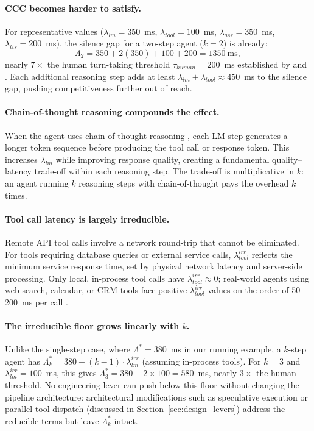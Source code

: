 \paragraph{CCC becomes harder to satisfy.}
For representative values ($\lambda_{lm} = 350$~ms, $\lambda_{tool} = 100$~ms,
$\lambda_{asr} = 350$~ms, $\lambda_{tts} = 200$~ms),
the silence gap for a two-step agent ($k = 2$) is already:
\[
  \Lambda_2 = 350 + 2(350) + 100 + 200 = 1350~\text{ms},
\]
nearly $7\times$ the human turn-taking threshold $\tau_{human} = 200$~ms
established by \citet{levinson2015timing} and \citet{stivers2009universals}.
Each additional reasoning step adds at least $\lambda_{lm} + \lambda_{tool} \approx 450$~ms
to the silence gap, pushing competitiveness further out of reach.

\paragraph{Chain-of-thought reasoning compounds the effect.}
When the agent uses chain-of-thought reasoning \citep{wei2023chainofthought},
each LM step generates a longer token sequence before producing the tool call
or response token.
This increases $\lambda_{lm}$ while improving response quality,
creating a fundamental quality--latency trade-off within each reasoning step.
The trade-off is multiplicative in $k$: an agent running $k$ reasoning steps
with chain-of-thought pays the overhead $k$ times.

\paragraph{Tool call latency is largely irreducible.}
Remote API tool calls involve a network round-trip that cannot be eliminated.
For tools requiring database queries or external service calls,
$\lambda_{tool}^{irr}$ reflects the minimum service response time,
set by physical network latency and server-side processing.
Only local, in-process tool calls have $\lambda_{tool}^{irr} \approx 0$;
real-world agents using web search, calendar, or CRM tools face positive
$\lambda_{tool}^{irr}$ values on the order of 50--200~ms per call
\citep{langgraph2024}.

\paragraph{The irreducible floor grows linearly with \texorpdfstring{$k$}{k}.}
Unlike the single-step case, where $\Lambda^* = 380$~ms in our running example,
a $k$-step agent has $\Lambda_k^* = 380 + (k-1) \cdot \lambda_{lm}^{irr}$ (assuming in-process tools).
For $k = 3$ and $\lambda_{lm}^{irr} = 100$~ms, this gives
$\Lambda_3^* = 380 + 2 \times 100 = 580$~ms,
nearly $3\times$ the human threshold.
No engineering lever can push below this floor without changing the pipeline
architecture: architectural modifications such as speculative execution or
parallel tool dispatch (discussed in Section~\ref{sec:design_levers}) address
the reducible terms but leave $\Lambda_k^*$ intact.
